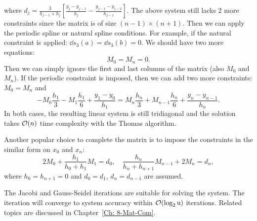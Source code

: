 where $d_j = \frac{3}{h_{j-1} + h_{j}}\left[ \frac{y_{j} - y_{j-1}}{h_{j}} - \frac{y_{j-1} - y_{j-2}}{h_{j-1}}\right]$. 
The above system still lacks 2 more constraints since the matrix is of size $(n-1)\times (n+1)$. Then we can apply the periodic spline or natural spline conditions. For example, if the natural constraint is applied: $\dd{s_3}(a) = \dd{s_3}(b) = 0$. We should have two more equations: 
\begin{equation}
    M_{0} = M_{n} = 0.
\end{equation} 
Then we can simply ignore the first and last columns of the matrix (also $M_0$ and $M_n$). 
If the periodic constraint is imposed, then we can add two more constraints: $M_0 = M_{n}$ and 
$$-M_0 \frac{h_{1}}{3} - M_1 \frac{h_1}{6} + \frac{y_1 - y_0}{h_1} = M_n \frac{h_n}{3} + M_{n-1} \frac{h_n}{6} + \frac{y_n - y_{n-1}}{h_n}.$$
In both cases, the resulting linear system is still tridiagonal and the solution takes $\mathcal O(n)$ time complexity with the Thomas algorithm. 

Another popular choice to complete the matrix is to impose the constraints in the similar form on $x_0$ and $x_n$: 
\begin{equation}
\label{EQ: EXTENSION}
    2M_0 + \frac{h_1}{h_0 + h_1} M_1 = d_0,\quad  \frac{h_n}{h_{n} + h_{n+1}} M_{n-1} + 2M_n = d_n,
\end{equation}
where $h_0 = h_{n+1} = 0$ and $d_0 = d_1$, $d_{n} = d_{n-1}$ are assumed. 
\begin{remark}
The Jacobi and Gauss-Seidel iterations are suitable for solving the system. The iteration will converge to system accuracy within $\mathcal O(\log_2 \textup{u})$ iterations. Related topics are discussed in Chapter~\ref{Ch: 8-Mat-Com}.
\end{remark}
